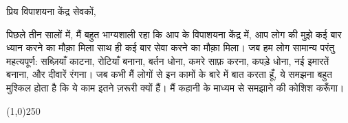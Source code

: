 \documentclass{article}
\begin{document}
प्रिय विपाशयना केंद्र सेवकों,

पिछले तीन सालों में, मैं बहुत भाग्यशाली रहा कि आप के विपाशयना केंद्र में, आप लोग की मुझे कई बार ध्यान करने का मौक़ा मिला साथ
ही कई बार सेवा करने का मौक़ा मिला। जब हम लोग सामान्य परंतु महत्यपूर्ण: सब्ज़ियाँ काटना, रोटियाँ
बनाना, बर्तन धोना, कमरे साफ़ करना, कपड़े धोना, नई इमारतें बनाना, और दीवारें रंगना। जब कभी मैं
लोगों से इन कामों के बारे में बात करता हूँ, ये समझना बहुत मुश्किल होता है कि ये काम इतने ज़रूरी क्यों हैं।
मैं कहानी के माध्यम से समझाने की कोशिश करूँगा।


\begin{center}
\line(1,0){250}
\end{center}
\end{document}
